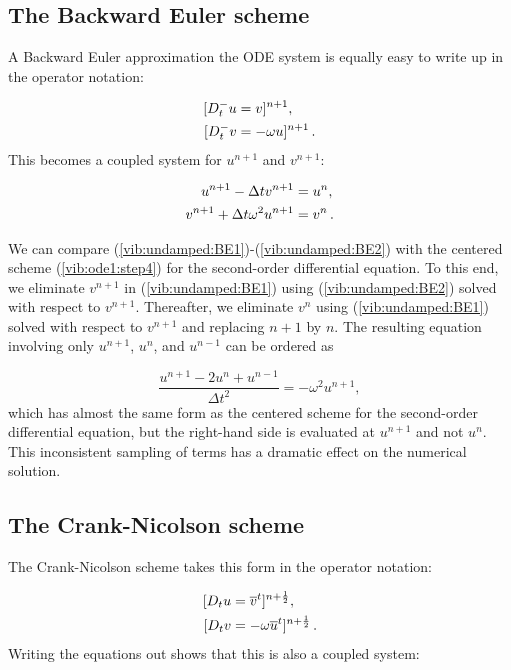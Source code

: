 \documentclass[%
oneside,                 %
final,                   %
10pt]{article}
\begin{document}
\subsection{The Backward Euler scheme}

A Backward Euler approximation the ODE system is equally easy to
write up in the operator notation:

\begin{align}
\lbrack D_t^- u &= v\rbrack^{n+1},\\ 
\lbrack D_t^- v &= -\omega u\rbrack^{n+1} \tp
\end{align}
This becomes a coupled system for $u^{n+1}$ and $v^{n+1}$:

\begin{align}
u^{n+1} - \Delta t v^{n+1} &= u^{n},
\label{vib:undamped:BE1}\\ 
v^{n+1} + \Delta t \omega^2 u^{n+1} &= v^{n}
\label{vib:undamped:BE2}
\tp
\end{align}

We can compare (\ref{vib:undamped:BE1})-(\ref{vib:undamped:BE2}) with
the centered scheme (\ref{vib:ode1:step4})
for the second-order differential equation.
To this end, we eliminate $v^{n+1}$ in (\ref{vib:undamped:BE1})
using (\ref{vib:undamped:BE2}) solved with respect to $v^{n+1}$.
Thereafter, we eliminate $v^n$ using (\ref{vib:undamped:BE1})
solved with respect to $v^{n+1}$ and replacing $n+1$ by $n$.
The resulting equation involving only $u^{n+1}$, $u^n$, and $u^{n-1}$
can be ordered as

\[ \frac{u^{n+1}-2u^n+u^{n-1}}{\Delta t^2} = -\omega^2 u^{n+1},\]
which has almost the same form as the centered scheme for the
second-order differential equation, but the right-hand side is
evaluated at $u^{n+1}$ and not $u^n$. This inconsistent sampling
of terms has a dramatic effect on the numerical solution.

\subsection{The Crank-Nicolson scheme}

The Crank-Nicolson scheme takes this form in the operator notation:

\begin{align}
\lbrack D_t u &= \overline{v}^t\rbrack^{n+\half},\\ 
\lbrack D_t v &= -\omega \overline{u}^t\rbrack^{n+\half}
\tp
\end{align}
Writing the equations out shows that this is also a coupled system:
\end{document}
